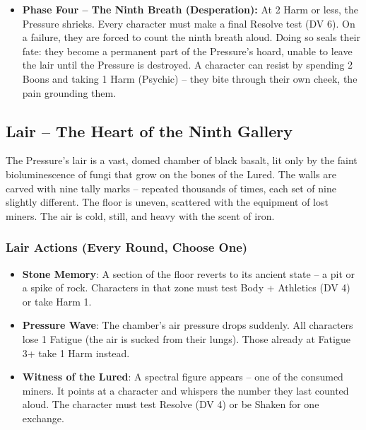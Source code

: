 \begin{itemize}
\begin{itemize}
            \item \textit{Coil of Oblivion}: A single target within Close is grappled (opposed Body + Athletics vs. Pressure's Body 6). While grappled, the target cannot breathe and takes 1 Harm per round (suffocation). The Pressure will release if it takes 2+ Harm in a single exchange.
        \end{itemize}
    \item \textbf{Phase Four -- The Ninth Breath (Desperation):} At 2 Harm or less, the Pressure shrieks. Every character must make a final Resolve test (DV 6). On a failure, they are forced to count the ninth breath aloud. Doing so seals their fate: they become a permanent part of the Pressure's hoard, unable to leave the lair until the Pressure is destroyed. A character can resist by spending 2 Boons and taking 1 Harm (Psychic) -- they bite through their own cheek, the pain grounding them.
\end{itemize}

\subsection{Lair -- The Heart of the Ninth Gallery}

The Pressure's lair is a vast, domed chamber of black basalt, lit only by the faint bioluminescence of fungi that grow on the bones of the Lured. The walls are carved with nine tally marks -- repeated thousands of times, each set of nine slightly different. The floor is uneven, scattered with the equipment of lost miners. The air is cold, still, and heavy with the scent of iron.

\subsubsection{Lair Actions (Every Round, Choose One)}
\begin{itemize}
    \item \textbf{Stone Memory}: A section of the floor reverts to its ancient state -- a pit or a spike of rock. Characters in that zone must test Body + Athletics (DV 4) or take Harm 1.
    \item \textbf{Pressure Wave}: The chamber's air pressure drops suddenly. All characters lose 1 Fatigue (the air is sucked from their lungs). Those already at Fatigue 3+ take 1 Harm instead.
    \item \textbf{Witness of the Lured}: A spectral figure appears -- one of the consumed miners. It points at a character and whispers the number they last counted aloud. The character must test Resolve (DV 4) or be Shaken for one exchange.
\end{itemize}

